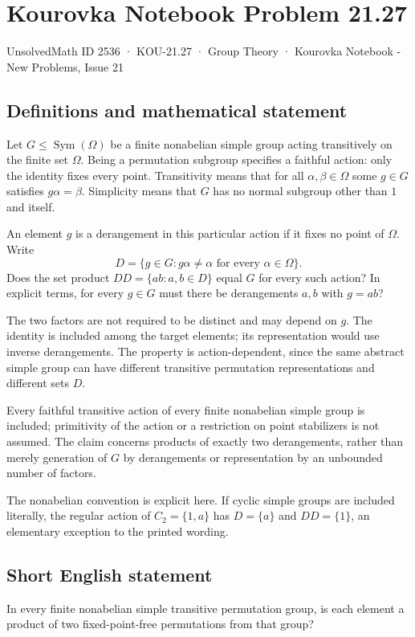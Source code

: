 \documentclass[11pt,a4paper]{article}
\begin{document}
\section*{Kourovka Notebook Problem 21.27}\label{2536}
{\small UnsolvedMath ID 2536 · KOU-21.27 · Group Theory · Kourovka Notebook - New Problems, Issue 21}
\subsection{Definitions and mathematical statement}
Let $G\le\operatorname{Sym}(\Omega)$ be a finite nonabelian simple group
acting transitively on the finite set $\Omega$. Being a permutation
subgroup specifies a faithful action: only the identity fixes every
point. Transitivity means that for all $\alpha,\beta\in\Omega$ some
$g\in G$ satisfies $g\alpha=\beta$. Simplicity means that $G$ has no
normal subgroup other than $1$ and itself.

An element $g$ is a derangement in this particular action if it fixes
no point of $\Omega$. Write
\[
 D=\{g\in G:g\alpha\ne\alpha\text{ for every }\alpha\in\Omega\}.
\]
Does the set product $DD=\{ab:a,b\in D\}$ equal $G$ for every such
action? In explicit terms, for every $g\in G$ must there be derangements
$a,b$ with $g=ab$?

The two factors are not required to be distinct and may depend on $g$.
The identity is included among the target elements; its representation
would use inverse derangements. The property is action-dependent, since
the same abstract simple group can have different transitive permutation
representations and different sets $D$.

Every faithful transitive action of every finite nonabelian simple group is included;
primitivity of the action or a restriction on point stabilizers is not
assumed. The claim concerns products of exactly two derangements, rather
than merely generation of $G$ by derangements or representation by an
unbounded number of factors.

The nonabelian convention is explicit here. If cyclic simple groups are
included literally, the regular action of $C_2=\{1,a\}$ has
$D=\{a\}$ and $DD=\{1\}$, an elementary exception to the printed wording.
\subsection{Short English statement}
In every finite nonabelian simple transitive permutation group, is each element a product of two fixed-point-free permutations from that group?
\end{document}
